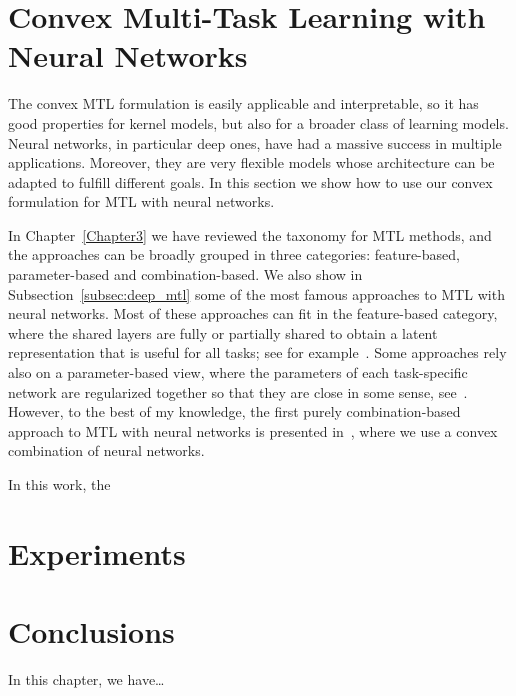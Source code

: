 \section{Convex Multi-Task Learning with Neural Networks}
The convex MTL formulation is easily applicable and interpretable, so it has good properties for kernel models, but also for a broader class of learning models.
Neural networks, in particular deep ones, have had a massive success in multiple applications. Moreover, they are very flexible models whose architecture can be adapted to fulfill different goals. In this section we show how to use our convex formulation for MTL with neural networks.

%
In Chapter~\ref{Chapter3} we have reviewed the taxonomy for MTL methods, and the approaches can be broadly grouped in three categories: feature-based, parameter-based and combination-based. 
We also show in Subsection~\ref{subsec:deep_mtl} some of the most famous approaches to MTL with neural networks. Most of these approaches can fit in the feature-based category, where the shared layers are fully or partially shared to obtain a latent representation that is useful for all tasks; see for example~\cite{Caruana97, MisraSGH16,RuderBAS17}. Some approaches rely also on a parameter-based view, where the parameters of each task-specific network are regularized together so that they are close in some sense, see~\cite{Long015a, YangH17a}.
However, to the best of my knowledge, the first purely combination-based approach to MTL with neural networks is presented in~\cite{RuizAD22_hais}, where we use a convex combination of neural networks.

In this work, the 
\section{Experiments}

\section{Conclusions}\label{sec-conclusions-3}

In this chapter, we have\dots
